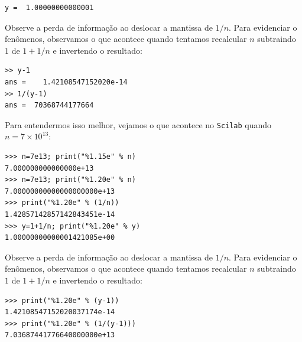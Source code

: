 \begin{ex}
\begin{verbatim}
y =  1.00000000000001
\end{verbatim}
Observe a perda de informação ao deslocar a mantissa de $1/n$. Para evidenciar o fenômenos, observamos o que acontece quando tentamos recalcular $n$ subtraindo $1$ de $1+1/n$ e invertendo o resultado:
\begin{verbatim}
>> y-1
ans =    1.42108547152020e-14
>> 1/(y-1)
ans =  70368744177664
\end{verbatim}
\fi
\ifisscilab
Para entendermos isso melhor, vejamos o que acontece no \verb+Scilab+ quando $n=7\times 10^{13}$:
\begin{verbatim}
>>> n=7e13; print("%1.15e" % n)
7.000000000000000e+13
>>> n=7e13; print("%1.20e" % n)
7.00000000000000000000e+13
>>> print("%1.20e" % (1/n))
1.42857142857142843451e-14
>>> y=1+1/n; print("%1.20e" % y)
1.00000000000001421085e+00
\end{verbatim}
Observe a perda de informação ao deslocar a mantissa de $1/n$. Para evidenciar o fenômenos, observamos o que acontece quando tentamos recalcular $n$ subtraindo $1$ de $1+1/n$ e invertendo o resultado:
\begin{verbatim}
>>> print("%1.20e" % (y-1))
1.42108547152020037174e-14
>>> print("%1.20e" % (1/(y-1)))
7.03687441776640000000e+13
\end{verbatim}
\fi
\end{ex}


